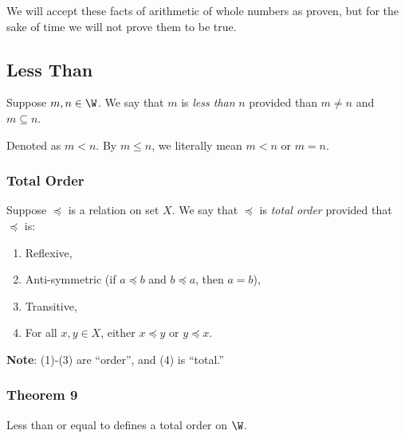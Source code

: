             We will accept these facts of arithmetic of whole numbers as proven, but for the sake of time we will not prove them to be true. 

    \subsection{Less Than}

        \begin{definition}
            Suppose $m,n\in \W$. We say that $m$ is \textit{less than} $n$ provided than $m \ne n$ and $m \subseteq n$.
        \end{definition}

        \begin{notation}
            Denoted as $m < n$. By $m \leq n$, we literally mean $m < n$ or $m = n$.
        \end{notation}

        \subsubsection{Total Order}
    
            \begin{definition}
                Suppose $\preceq$ is a relation on set $X$. We say that $\preceq$ is \textit{total order} provided that $\preceq$ is: \begin{enumerate}
                    \item Reflexive,
                    \item Anti-symmetric (if $a \preceq b$ and $b \preceq a$, then $a = b$),
                    \item Transitive,
                    \item For all $x,y\in X$, either $x\preceq y$ or $y\preceq x$.
                \end{enumerate}
            \end{definition}
        
        \noindent\textbf{Note}: (1)-(3) are ``order'', and (4) is ``total.''

        \subsubsection{Theorem 9}

            \begin{ntheorem}
                Less than or equal to defines a total order on $\W$.
            \end{ntheorem}


